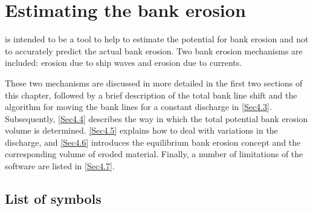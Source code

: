 \chapter{Estimating the bank erosion} \label{Chp:BankErosion}

\dfastbe is intended to be a tool to help to estimate the potential for bank erosion and not to accurately predict the actual bank erosion.
Two bank erosion mechanisms are included: erosion due to ship waves and erosion due to currents.

These two mechanisms are discussed in more detailed in the first two sections of this chapter, followed by a brief description of the total bank line shift and the algorithm for moving the bank lines for a constant discharge in \autoref{Sec4.3}.
Subsequently, \autoref{Sec4.4} describes the way in which the total potential bank erosion volume is determined.
\autoref{Sec4.5} explains how to deal with variations in the discharge, and \autoref{Sec4.6} introduces the equilibrium bank erosion concept and the corresponding volume of eroded material.
Finally, a number of limitations of the software are listed in \autoref{Sec4.7}.

\section{List of symbols} \label{Sec:SymbolList}

